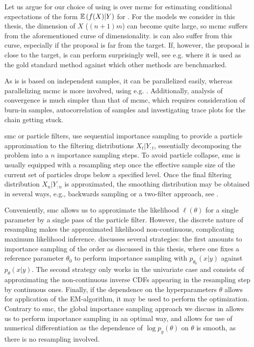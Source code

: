 Let us argue for our choice of using \acrshort{is} over \acrshort{mcmc} for estimating conditional expectations of the form $\mathbb E \left( f(X)|Y \right)$ for . For the models we consider in this thesis, the dimension of $X$ ($(n+1)m$) can become quite large, so \acrshort{mcmc} suffers from the aforementioned curse of dimensionality. \acrshort{is} can also suffer from this curse, especially if the proposal is far from the target. If, however, the proposal is close to the target, \acrshort{is} can perform surprisingly well, see e.g. \citep{Chopin2017Leave} where it is used as the gold standard method against which other methods are benchmarked. 

As \acrshort{is} is based on independent samples, it can be parallelized easily, whereas parallelizing \acrshort{mcmc} is more involved, using e.g. \citep{Neiswanger2014Asymptotically}. Additionally, analysis of convergence is much simpler than that of \acrshort{mcmc}, which requires consideration of burn-in samples, autocorrelation of samples and investigating trace plots for the chain getting stuck. 

\gls{smc} \citep{Chopin2020Introduction} or particle filters, use sequential importance sampling to provide a particle approximation to the filtering distributions $X_{t} | Y_{:t}$, essentially decomposing the problem into a $n$ importance sampling steps. 
To avoid particle collapse, \gls{smc} is usually equipped with a resampling step once the effective sample size of the current set of particles drops below a specified level. Once the final filtering distribution $X_{n}|Y_{:n}$ is approximated, the smoothing distribution may be obtained in several ways, e.g., backwards sampling or a two-filter approach, see \citep[Chapter 12]{Chopin2020Introduction}.

Conveniently, \gls{smc} allows us to approximate the likelihood $\ell(\theta)$ for a single parameter by a single pass of the particle filter. However, the discrete nature of resampling makes the approximated likelihood non-continuous, complicating maximum likelihood inference. \citep[Chapter 14]{Chopin2020Introduction} discusses several strategies: the first amounts to importance sampling of the order as discussed in this thesis, where one fixes a reference parameter $\theta_{0}$ to perform importance sampling with $p_{\theta_{0}}(x|y)$ against $p_{\theta}(x|y)$. The second strategy only works in the univariate case and consists of approximating the non-continuous inverse CDFs appearing in the resampling step by continuous ones. Finally, if the dependence on the hyperparameters $\theta$ allows for application of the EM-algorithm, it may be used to perform the optimization. 
Contrary to \gls{smc}, the global importance sampling approach we discuss in  allows us to perform importance sampling in an optimal way, and allows for use of numerical differentiation as the dependence of $\log p_{y} (\theta)$ on $\theta$ is smooth, as there is no resampling involved.

